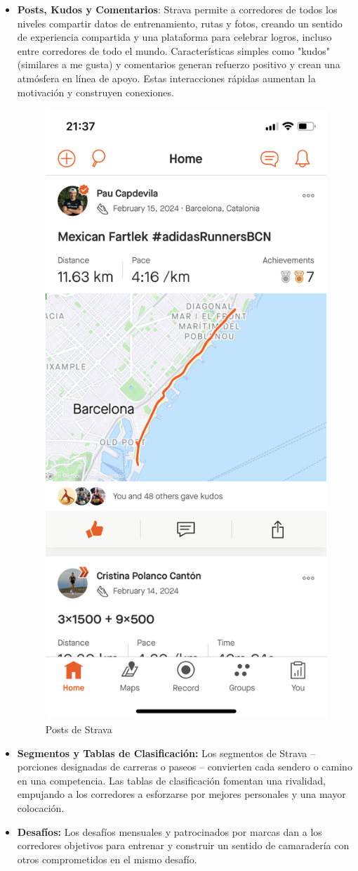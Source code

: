 \begin{itemize}
\item \textbf{Posts, Kudos y Comentarios}: Strava permite a corredores de todos los niveles compartir datos de entrenamiento, 
rutas y fotos, creando un sentido de experiencia compartida y una plataforma para celebrar logros, incluso entre corredores de 
todo el mundo. Características simples como "kudos" (similares a me gusta) y comentarios generan refuerzo positivo y crean una 
atmósfera en línea de apoyo. Estas interacciones rápidas aumentan la motivación y construyen conexiones.

\begin{figure}[H]
  \centering
  \includegraphics[cframe=black 2pt,width=0.3\linewidth]{images/estadodelarte/stravaposts.jpeg}
  \caption{Posts de Strava}
  \label{fig:strava_posts}
\end{figure}


\item \textbf{Segmentos y Tablas de Clasificación:} Los segmentos de Strava – porciones designadas de carreras o paseos – convierten cada 
sendero o camino en una competencia. Las tablas de clasificación fomentan una rivalidad, empujando a los corredores a esforzarse por mejores personales y una mayor colocación.

\item \textbf{Desafíos:} Los desafíos mensuales y patrocinados por marcas dan a los corredores objetivos para entrenar y construir un 
sentido de camaradería con otros comprometidos en el mismo desafío.


\end{itemize}
